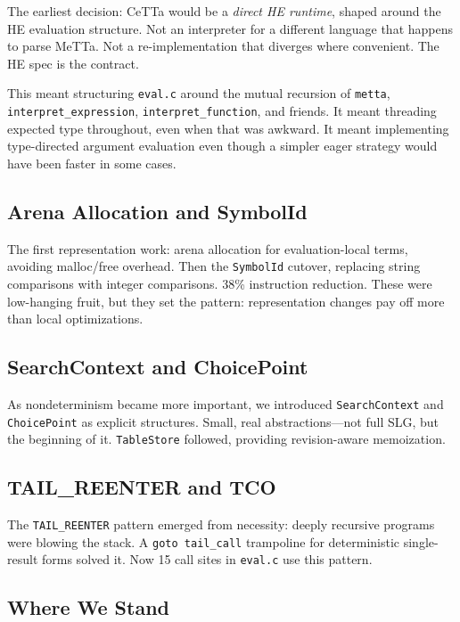 \documentclass[11pt]{article}
\newcommand{\code}[1]{\texttt{#1}}
\newcommand{\HE}{\textup{HE}}
\newcommand{\CeTTa}{\textup{CeTTa}}
\begin{document}
The earliest decision: \CeTTa{} would be a \emph{direct \HE{} runtime},
shaped around the \HE{} evaluation structure.  Not an interpreter for
a different language that happens to parse MeTTa.  Not a re-implementation
that diverges where convenient.  The \HE{} spec is the contract.

This meant structuring \code{eval.c} around the mutual recursion of
\code{metta}, \code{interpret\_expression}, \code{interpret\_function},
and friends.  It meant threading expected type throughout, even when
that was awkward.  It meant implementing type-directed argument
evaluation even though a simpler eager strategy would have been faster
in some cases.

\subsection{Arena Allocation and SymbolId}

The first representation work: arena allocation for evaluation-local
terms, avoiding malloc/free overhead.  Then the \code{SymbolId} cutover,
replacing string comparisons with integer comparisons.  38\% instruction
reduction.  These were low-hanging fruit, but they set the pattern:
representation changes pay off more than local optimizations.

\subsection{SearchContext and ChoicePoint}

As nondeterminism became more important, we introduced
\code{SearchContext} and \code{ChoicePoint} as explicit structures.
Small, real abstractions---not full SLG, but the beginning of it.
\code{TableStore} followed, providing revision-aware memoization.

\subsection{TAIL\_REENTER and TCO}

The \code{TAIL\_REENTER} pattern emerged from necessity: deeply recursive
programs were blowing the stack.  A \code{goto tail\_call} trampoline
for deterministic single-result forms solved it.  Now 15 call sites
in \code{eval.c} use this pattern.

\subsection{Where We Stand}
\end{document}
